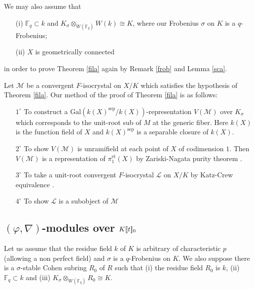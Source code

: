 \documentclass[11pt]{amsart}
\begin{document}
\vspace*{3mm}

We may also assume that 
\begin{enumerate}
\item[(i)] $\mathbb F_q \subset k$ and $K_\sigma \otimes_{W(\mathbb F_q)}W(k) \cong K$, where 
our Frobenius $\sigma$ on $K$ is a $q$-Frobenius;  
\item[(ii)] $X$ is geometrically connected
\end{enumerate}
in order to prove Theorem \ref{fila} again by Remark \ref{frob} and Lemma \ref{sca}. 

Let $\mathcal M$ be  a convergent $F$-isocrystal on $X/K$ which satisfies the 
hypothesis of Theorem \ref{fila}. Our method of the proof of Theorem \ref{fila} is as follows:
\begin{enumerate}
\item[$1^\circ$] To construct a $\mathrm{Gal}(k(X)^{\mathrm{sep}}/k(X))$-representation $V(\mathcal M)$ 
over $K_\sigma$ which corresponds to the unit-root sub of $M$ at the generic fiber. 
Here $k(X)$ is the function field of $X$ and $k(X)^{\mathrm{sep}}$ is 
a separable closure of $k(X)$. 
\item[$2^\circ$] To show $V(\mathcal M)$ is unramifield at each point of $X$ of codimension $1$. 
Then $V(\mathcal M)$ is a representation of $\pi_1^{\mathrm{et}}(X)$ by Zariski-Nagata purity theorem \cite[X, Theorem 3.4]{SGA2}. 
\item[$3^\circ$] To take a unit-root convergent $F$-isocrystal $\mathcal L$ on $X/K$ by Katz-Crew equivalence 
\cite[Theorem 2.1]{Cr}. 
\item[$4^\circ$] To show $\mathcal L$ is a subobject of $\mathcal M$
\end{enumerate}

\subsection{$(\varphi, \nabla)$-modules over $K[\hspace*{-0.6mm}[t]\hspace*{-0.6mm}]_0$}

Let us assume that the residue field $k$ of $K$ is arbitrary of characteristic $p$ (allowing a non perfect field) 
and $\sigma$ is a $q$-Frobenius on $K$. We also suppose 
there is a $\sigma$-stable Cohen subring $R_0$ of $R$ such that (i) the residue field $R_0$ is $k$, 
(ii) $\mathbb F_q \subset k$ and (iii) $K_\sigma \otimes_{W(\mathbb F_q)}R_0 \cong K$. 
\end{document}
